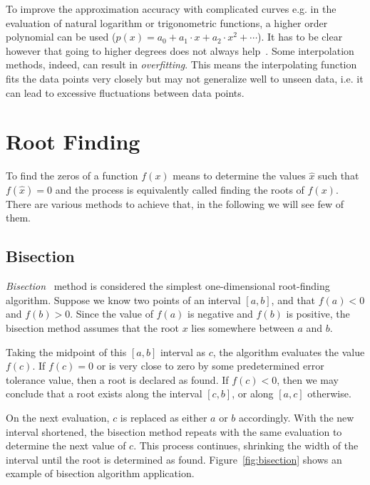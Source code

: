 To improve the approximation accuracy with complicated curves e.g. in the evaluation of natural logarithm or trigonometric functions, a higher order polynomial 
can be used ($p(x)=a_0 + a_1\cdot x + a_2\cdot x^2+\cdots$). It has to be clear however that going to higher degrees does not always help~\cite{bib:runge}.
Some interpolation methods, indeed, can result in \emph{overfitting}. This means the interpolating function fits the data points very closely but may not 
generalize well to unseen data, i.e. it can lead to excessive fluctuations between data points.

\section{Root Finding}
\label{sec:root_finding}

To find the zeros of a function $f(x)$ means to determine the values $\hat{x}$ such that $f(\hat{x})=0$ and the process is equivalently called finding the 
roots of $f(x)$. There are various methods to achieve that, in the following we will see few of them.

\subsection{Bisection}
\emph{Bisection}~\cite{bib:bisection} method is considered the simplest one-dimensional root-finding algorithm.
Suppose we know two points of an interval $[a,b]$, and that $f(a)< 0$ and $f(b)> 0$.
Since the value of $f(a)$ is negative and $f(b)$ is positive, the bisection method assumes that the root $x$ lies somewhere between $a$ and $b$.

Taking the midpoint of this $[a, b]$ interval as $c$, the algorithm evaluates the value $f(c)$.
If $f(c) = 0$ or is very close to zero by some predetermined error tolerance value, then a root is declared as found. If $f(c)< 0$, then we may conclude that a root exists along the interval $[c, b]$, or along $[a,c]$ otherwise.

On the next evaluation, $c$ is replaced as either $a$ or $b$ accordingly. With the new interval shortened, the bisection method repeats with the same evaluation to determine the next value of $c$. This process continues, shrinking the width of the interval until the root is determined as found. Figure~\ref{fig:bisection} shows an example of bisection algorithm application.

